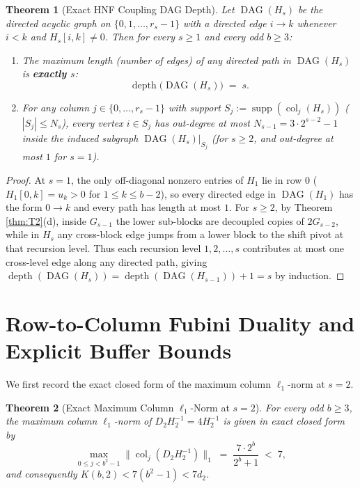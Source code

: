 \documentclass[11pt,a4paper]{article}
\theoremstyle{plain}
\newtheorem{theorem}{Theorem}[section]
\theoremstyle{definition}
\newcommand{\supp}{\operatorname{supp}}
\newcommand{\DAG}{\operatorname{DAG}}
\newcommand{\depth}{\operatorname{depth}}
\newcommand{\col}{\operatorname{col}}
\begin{document}
\begin{theorem}[Exact HNF Coupling DAG Depth]\label{thm:T4}
Let $\DAG(H_s)$ be the directed acyclic graph on $\{0, 1, \dots, r_s - 1\}$ with a directed edge $i \to k$ whenever $i < k$ and $H_s[i,k] \neq 0$. Then for every $s \ge 1$ and every odd $b \ge 3$:
\begin{enumerate}[label=(\alph*)]
\item The maximum length (number of edges) of any directed path in $\DAG(H_s)$ is \textbf{exactly $s$}:
\[
\boxed{\; \depth\big(\DAG(H_s)\big) \;=\; s. \;}
\]
\item For any column $j \in \{0, \dots, r_s-1\}$ with support $S_j := \supp(\col_j(H_s))$ ($|S_j| \le N_s$), every vertex $i \in S_j$ has out-degree at most $N_{s-1} = 3 \cdot 2^{s-2} - 1$ inside the induced subgraph $\DAG(H_s)|_{S_j}$ (for $s \ge 2$, and out-degree at most $1$ for $s = 1$).
\end{enumerate}
\end{theorem}

\begin{proof}
At $s = 1$, the only off-diagonal nonzero entries of $H_1$ lie in row $0$ ($H_1[0,k] = u_k > 0$ for $1 \le k \le b-2$), so every directed edge in $\DAG(H_1)$ has the form $0 \to k$ and every path has length at most $1$. For $s \ge 2$, by Theorem \ref{thm:T2}(d), inside $G_{s-1}$ the lower sub-blocks are decoupled copies of $2G_{s-2}$, while in $H_s$ any cross-block edge jumps from a lower block to the shift pivot at that recursion level. Thus each recursion level $1, 2, \dots, s$ contributes at most one cross-level edge along any directed path, giving $\depth(\DAG(H_s)) = \depth(\DAG(H_{s-1})) + 1 = s$ by induction.
\end{proof}

\section{Row-to-Column Fubini Duality and Explicit Buffer Bounds}

We first record the exact closed form of the maximum column $\ell_1$-norm at $s = 2$.

\begin{theorem}[Exact Maximum Column $\ell_1$-Norm at $s = 2$]\label{thm:T5}
For every odd $b \ge 3$, the maximum column $\ell_1$-norm of $D_2 H_2^{-1} = 4 H_2^{-1}$ is given in exact closed form by
\begin{equation}\label{eq:col-s2}
\boxed{\; \max_{0 \le j < b^2 - 1} \|\col_j(D_2 H_2^{-1})\|_1 \;=\; \frac{7 \cdot 2^b}{2^b + 1} \;<\; 7, \;}
\end{equation}
and consequently $K(b,2) < 7(b^2 - 1) < 7 d_2$.
\end{theorem}
\end{document}
